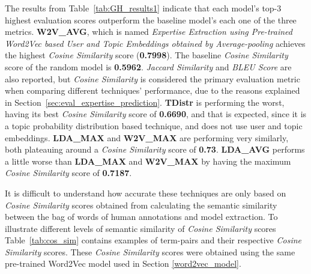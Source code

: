             The results from Table~\ref{tab:GH_results1} indicate that each model's top-$3$ highest evaluation scores outperform the baseline model's each one of the three metrics. \textbf{W2V\_AVG}, which is named \emph{Expertise Extraction using Pre-trained Word2Vec based User and Topic Embeddings obtained by Average-pooling} achieves the highest \emph{Cosine Similarity} score (\textbf{0.7998}). The baseline \emph{Cosine Similarity} score of the random model is \textbf{0.5962}. \emph{Jaccard Similarity} and \emph{BLEU Score} are also reported, but \emph{Cosine Similarity} is considered the primary evaluation metric when comparing different techniques' performance, due to the reasons explained in Section~\ref{sec:eval_expertise_prediction}. \textbf{TDistr} is performing the worst, having its best \emph{Cosine Similarity} score of \textbf{0.6690}, and that is expected, since it is a topic probability distribution based technique, and does not use user and topic embeddings. \textbf{LDA\_MAX} and \textbf{W2V\_MAX} are performing very similarly, both plateauing around a \emph{Cosine Similarity} score of \textbf{0.73}. \textbf{LDA\_AVG} performs a little worse than  \textbf{LDA\_MAX} and \textbf{W2V\_MAX} by having the maximum \emph{Cosine Similarity} score of \textbf{0.7187}. 
            
            It is difficult to understand how accurate these techniques are only based on \emph{Cosine Similarity} scores obtained from calculating the semantic similarity between the bag of words of human annotations and model extraction. To illustrate different levels of semantic similarity of \emph{Cosine Similarity} scores Table~\ref{tab:cos_sim} contains examples of term-pairs and their respective \emph{Cosine Similarity} scores. These \emph{Cosine Similarity} scores were obtained using the same pre-trained Word2Vec model\cite{efstathiou2018word} used in Section \ref{word2vec_model}. 
            
